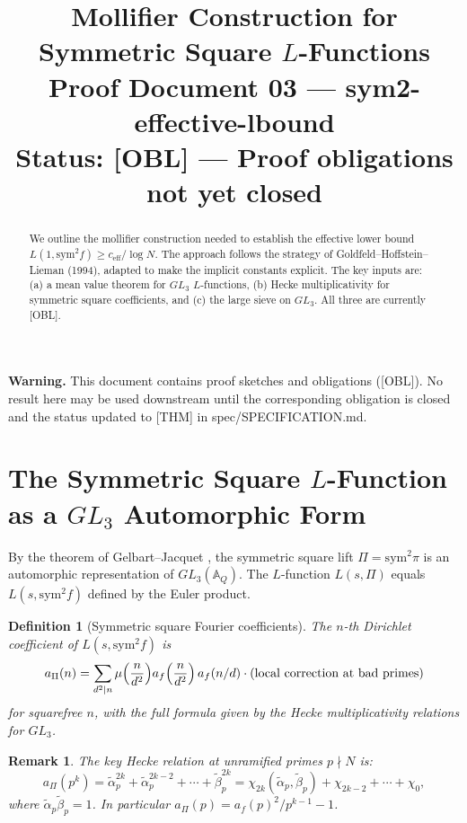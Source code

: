 \documentclass[12pt]{article}
\title{Mollifier Construction for Symmetric Square $L$-Functions\\
\large Proof Document 03 --- sym2-effective-lbound\\
\normalsize \textbf{Status: [OBL] --- Proof obligations not yet closed}}
\author{}
\date{}
\newtheorem{definition}[theorem]{Definition}
\newtheorem{remark}[theorem]{Remark}
\newcommand{\A}{\mathbb{A}}
\begin{document}
\maketitle

\noindent\textbf{Warning.}  This document contains proof sketches and obligations
([OBL]).  No result here may be used downstream until the corresponding obligation
is closed and the status updated to [THM] in spec/SPECIFICATION.md.

\begin{abstract}
We outline the mollifier construction needed to establish the effective lower bound
$L(1, \mathrm{sym}^2 f) \geq c_{\mathrm{eff}}/\log N$.  The approach follows the strategy
of Goldfeld--Hoffstein--Lieman (1994), adapted to make the implicit constants explicit.
The key inputs are: (a) a mean value theorem for $GL_3$ $L$-functions, (b) Hecke
multiplicativity for symmetric square coefficients, and (c) the large sieve on $GL_3$.
All three are currently [OBL].
\end{abstract}

\tableofcontents

\section{The Symmetric Square $L$-Function as a $GL_3$ Automorphic Form}

By the theorem of Gelbart--Jacquet \cite{GJ78}, the symmetric square lift
$\Pi = \mathrm{sym}^2 \pi$ is an automorphic representation of $GL_3(\A_Q)$.
The $L$-function $L(s, \Pi)$ equals $L(s, \mathrm{sym}^2 f)$ defined by the Euler product.

\begin{definition}[Symmetric square Fourier coefficients]
The $n$-th Dirichlet coefficient of $L(s, \mathrm{sym}^2 f)$ is
\[
  a_{\Pi}(n) = \sum_{d^2 \mid n} \mu\Bigl(\frac{n}{d^2}\Bigr)
               a_f\Bigl(\frac{n}{d^2}\Bigr)\, a_f(n/d)\cdot (\text{local correction at bad primes})
\]
for squarefree $n$, with the full formula given by the Hecke multiplicativity relations
for $GL_3$.
\end{definition}

\begin{remark}
The key Hecke relation at unramified primes $p \nmid N$ is:
\[
  a_\Pi(p^k) = \tilde\alpha_p^{2k} + \tilde\alpha_p^{2k-2} + \cdots + \tilde\beta_p^{2k}
  = \chi_{2k}(\tilde\alpha_p, \tilde\beta_p) + \chi_{2k-2} + \cdots + \chi_0,
\]
where $\tilde\alpha_p \tilde\beta_p = 1$.  In particular $a_\Pi(p) = a_f(p)^2/p^{k-1} - 1$.
\end{remark}
\end{document}
